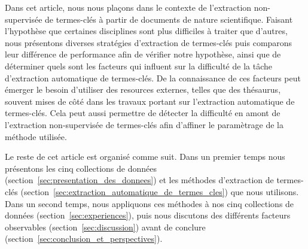   Dans cet article, nous nous plaçons dans le contexte de l'extraction
  non-supervisée de termes-clés à partir de documents de nature scientifique.
  Faisant l'hypothèse que certaines disciplines sont plus difficiles à traiter
  que d'autres, nous présentons diverses stratégies d'extraction de termes-clés
  puis comparons leur différence de performance afin de vérifier notre
  hypothèse, ainsi que de déterminer quels sont les facteurs qui influent sur la
  difficulté de la tâche d'extraction automatique de termes-clés. De la
  connaissance de ces facteurs peut émerger le besoin d'utiliser des resources
  externes, telles que des thésaurus, souvent mises de côté dans les travaux
  portant sur l'extraction automatique de termes-clés. Cela peut aussi permettre
  de détecter la difficulté en amont de l'extraction non-supervisée de
  termes-clés afin d'affiner le paramètrage de la méthode utilisée.

  Le reste de cet article est organisé comme suit. Dans un premier temps nous
  présentons les cinq collections de données
  (section~\ref{sec:presentation_des_donnees}) et les méthodes d'extraction de
  termes-clés (section~\ref{sec:extraction_automatique_de_termes_cles}) que nous
  utilisons. Dans un second temps, nous appliquons ces méthodes à nos cinq
  collections de données (section~\ref{sec:experiences}), puis nous discutons
  des différents facteurs observables (section~\ref{sec:discussion}) avant de
  conclure (section~\ref{sec:conclusion_et_perspectives}).

